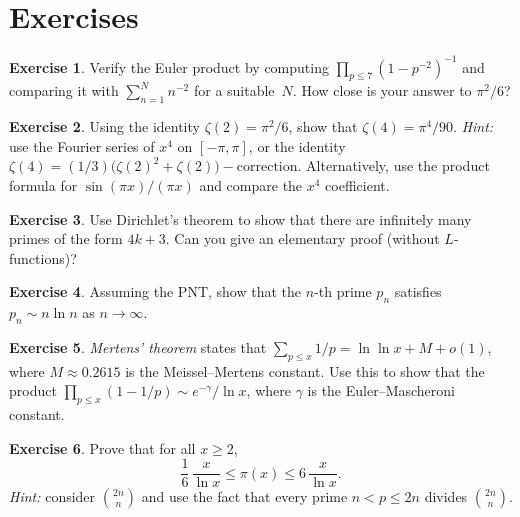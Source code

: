 \documentclass[12pt,a4paper,openany]{book}
\theoremstyle{definition}
\newtheorem{exercise}{Exercise}[chapter]
\theoremstyle{plain}
\theoremstyle{remark}
\begin{document}
\section{Exercises}
\label{sec:analytic-exercises}

\begin{exercise}
\label{exer:euler-product-compute}
Verify the Euler product by computing $\prod_{p \leq 7}(1-p^{-2})^{-1}$ and
comparing it with $\sum_{n=1}^{N} n^{-2}$ for a suitable~$N$. How close is
your answer to $\pi^2/6$?
\end{exercise}

\begin{exercise}
\label{exer:zeta-even}
Using the identity $\zeta(2) = \pi^2/6$, show that $\zeta(4) = \pi^4/90$.
\emph{Hint:} use the Fourier series of $x^4$ on $[-\pi,\pi]$, or the identity
$\zeta(4) = (1/3)\bigl(\zeta(2)^2 + \zeta(2)\bigr) - \text{correction}$.
Alternatively, use the product formula for $\sin(\pi x)/(\pi x)$ and compare
the $x^4$ coefficient.
\end{exercise}

\begin{exercise}
\label{exer:dirichlet-3-mod4}
Use Dirichlet's theorem to show that there are infinitely many primes of the
form $4k+3$. Can you give an elementary proof (without $L$-functions)?
\end{exercise}

\begin{exercise}
\label{exer:PNT-consequences}
Assuming the PNT, show that the $n$-th prime $p_n$ satisfies
$p_n \sim n \ln n$ as $n \to \infty$.
\end{exercise}

\begin{exercise}
\label{exer:mertens-theorem}
\emph{Mertens' theorem} states that $\sum_{p\leq x}1/p = \ln\ln x + M + o(1)$,
where $M \approx 0.2615$ is the Meissel--Mertens constant. Use this to show
that the product $\prod_{p\leq x}(1-1/p) \sim e^{-\gamma}/\ln x$, where
$\gamma$ is the Euler--Mascheroni constant.
\end{exercise}

\begin{exercise}
\label{exer:chebyshev-bounds}
Prove that for all $x \geq 2$,
\[
  \frac{1}{6}\,\frac{x}{\ln x} \leq \pi(x) \leq 6\,\frac{x}{\ln x}.
\]
\emph{Hint:} consider $\binom{2n}{n}$ and use the fact that every prime
$n < p \leq 2n$ divides $\binom{2n}{n}$.
\end{exercise}
\end{document}

